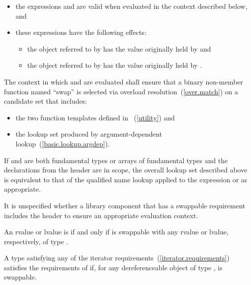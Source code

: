 \begin{itemize}
\item the expressions  and  are valid when
evaluated in the context described below, and

\item these expressions have the following effects:

\begin{itemize}
\item the object referred to by  has the value originally held by  and
\item the object referred to by  has the value originally held by .
\end{itemize}
\end{itemize}

\pnum
The context in which  and  are evaluated shall
ensure that a binary non-member function named ``swap'' is selected via overload
resolution~(\ref{over.match}) on a candidate set that includes:

\begin{itemize}
\item the two  function templates defined in
~(\ref{utility}) and

\item the lookup set produced by argument-dependent lookup~(\ref{basic.lookup.argdep}).
\end{itemize}

\enternote If  and  are both fundamental types or arrays of
fundamental types and the declarations from the header  are in
scope, the overall lookup set described above is equivalent to that of the
qualified name lookup applied to the expression  or
 as appropriate. \exitnote

\enternote It is unspecified whether a library component that has a swappable
requirement includes the header  to ensure an appropriate
evaluation context. \exitnote

\pnum
An rvalue or lvalue  is  if and only if  is
swappable with any rvalue or lvalue, respectively, of type .

\pnum
A type  satisfying any of the iterator requirements~(\ref{iterator.requirements})
satisfies the requirements of  if,
for any dereferenceable object
 of type ,
 is swappable.


